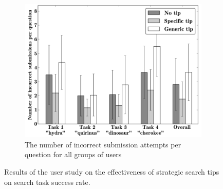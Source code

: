 \begin{figure}
\begin{subfigure}[t]{0.32\textwidth}
  \centering
  \includegraphics[width=\textwidth]{img/hints_incorrect}
  \caption{The number of incorrect submission attempts per question for all groups of users}
  \label{figure:conversation:hints:incorrect}
  \end{subfigure}
\caption{Results of the user study on the effectiveness of strategic search tips on search task success rate.}
\label{fig:conversation:hints:results}
\end{figure}

